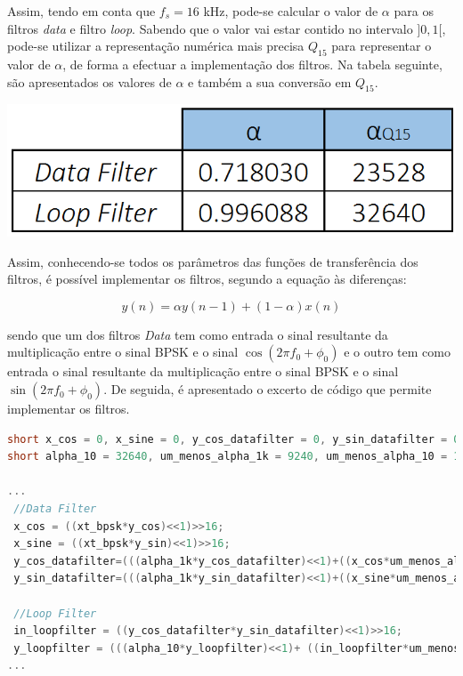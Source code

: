 \documentclass[11pt]{article}
\numberwithin{equation}{section}
\begin{document}
\vspace{1mm}
Assim, tendo em conta que $f_s = 16$ kHz, pode-se calcular o valor de $\alpha$ para os filtros \textit{data} e filtro \textit{loop}. Sabendo que o valor vai estar contido no intervalo $]0,1[$, pode-se utilizar a representação numérica mais precisa $Q_{15}$ para representar o valor de $\alpha$, de forma a efectuar a implementação dos filtros. Na tabela seguinte, são apresentados os valores de $\alpha$ e também a sua conversão em $Q_{15}$.

\begin{table}[H]
	\centering
	\caption{Valores de $\alpha$ dos filtros passa-baixo.}
	\vspace{-1.5mm}
	\includegraphics[keepaspectratio=true, scale=0.35]{tabelas/alphas}
\end{table}

Assim, conhecendo-se todos os parâmetros das funções de transferência dos filtros, é possível implementar os filtros, segundo a equação às diferenças:

\vspace{-3mm}
\begin{equation}
y(n) = \alpha y(n-1) +  (1-\alpha)x(n)
\end{equation} 

sendo que um dos filtros \textit{Data} tem como entrada o sinal resultante da multiplicação entre o sinal BPSK e o sinal $\cos(2\pi f_0 + \phi_0)$ e o outro tem como entrada o sinal resultante da multiplicação entre o sinal BPSK e o sinal $\sin(2\pi f_0 + \phi_0)$. De seguida, é apresentado o excerto de código que permite implementar os filtros. 

\begin{lstlisting}[language=C]
short x_cos = 0, x_sine = 0, y_cos_datafilter = 0, y_sin_datafilter = 0;  short in_loopfilter = 0, y_loop filter = 0, alpha_1k = 23528; 
short alpha_10 = 32640, um_menos_alpha_1k = 9240, um_menos_alpha_10 = 127;

...
 //Data Filter
 x_cos = ((xt_bpsk*y_cos)<<1)>>16;
 x_sine = ((xt_bpsk*y_sin)<<1)>>16;
 y_cos_datafilter=(((alpha_1k*y_cos_datafilter)<<1)+((x_cos*um_menos_alpha_1k)<<1))>>16;
 y_sin_datafilter=(((alpha_1k*y_sin_datafilter)<<1)+((x_sine*um_menos_alpha_1k)<<1))>>16;

 //Loop Filter
 in_loopfilter = ((y_cos_datafilter*y_sin_datafilter)<<1)>>16;
 y_loopfilter = (((alpha_10*y_loopfilter)<<1)+ ((in_loopfilter*um_menos_alpha_10)<<1))>>16;
...

\end{lstlisting}
\end{document}
